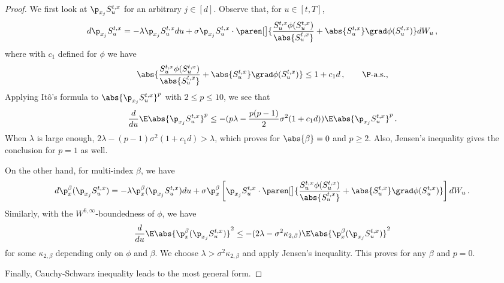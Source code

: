 \documentclass{amsart}
\begin{document}
\begin{proof}
	We first look at $\p_{x_j} S^{t,x}_u$ for an arbitrary $j \in [d]$. 
	Observe that, for $u \in [t,T]$,
	\begin{equation*}
		d \p_{x_j} S^{t,x}_u = -\lambda \p_{x_j} S^{t,x}_u du + \sigma \p_{x_j} S^{t,x}_u \cdot \paren[\big]{ \frac{S^{t,x}_u \phi(S^{t,x}_u)}{\abs{S^{t,x}_u}} + \abs{S^{t,x}_u} \grad\phi(S^{t,x}_u) } dW_u  \,,
	\end{equation*}
	where with $c_1$ defined for $\phi$ we have 
	\begin{equation*}
		\abs{ \frac{S^{t,x}_u \phi(S^{t,x}_u)}{\abs{S^{t,x}_u}} + \abs{S^{t,x}_u} \grad\phi(S^{t,x}_u) } \le 1 + c_1 d \,, \qquad \P\text{-a.s.,}
	\end{equation*}
	Applying It\^{o}'s formula to $\abs{\p_{x_j} S^{t,x}_u}^p$ with $2 \le p \le 10$, we see that 
	\begin{equation*}
		\frac{d}{du} \E \abs{\p_{x_j} S^{t,x}_u}^p \le -(p\lambda - \frac{p(p-1)}{2} \sigma^2 (1+c_1 d)) \E \abs{\p_{x_j} S^{t,x}_u}^p \,.
	\end{equation*}
	When $\lambda$ is large enough, $2\lambda - (p-1) \sigma^2 (1+c_1 d) > \lambda$, which proves for $\abs{\beta} = 0$ and $p \ge 2$. 
	Also, Jensen's inequality gives the conclusion for $p=1$ as well. 

	On the other hand, for multi-index $\beta$, we have 
	\begin{equation*}
		d \p_x^\beta (\p_{x_j} S^{t,x}_u) = -\lambda \p_x^\beta (\p_{x_j} S^{t,x}_u) du + \sigma \p_x^\beta \left[ \p_{x_j} S^{t,x}_u \cdot \paren[\big]{ \frac{S^{t,x}_u \phi(S^{t,x}_u)}{\abs{S^{t,x}_u}} + \abs{S^{t,x}_u} \grad\phi(S^{t,x}_u) } \right] dW_u  \,.
	\end{equation*}
	Similarly, with the $W^{6,\infty}$-boundedness of $\phi$, we have 
	\begin{equation*}
		\frac{d}{du} \E \abs{\p_x^\beta (\p_{x_j} S^{t,x}_u)}^2 \le -(2\lambda - \sigma^2 \kappa_{2,\beta}) \E \abs{\p_x^\beta (\p_{x_j} S^{t,x}_u)}^2
	\end{equation*}
	for some $\kappa_{2,\beta}$ depending only on $\phi$ and $\beta$. 
	We choose $\lambda > \sigma^2 \kappa_{2,\beta}$ and apply Jensen's inequality.
	This proves for any $\beta$ and $p=0$. 

	Finally, Cauchy-Schwarz inequality leads to the most general form. 
\end{proof}
\end{document}
